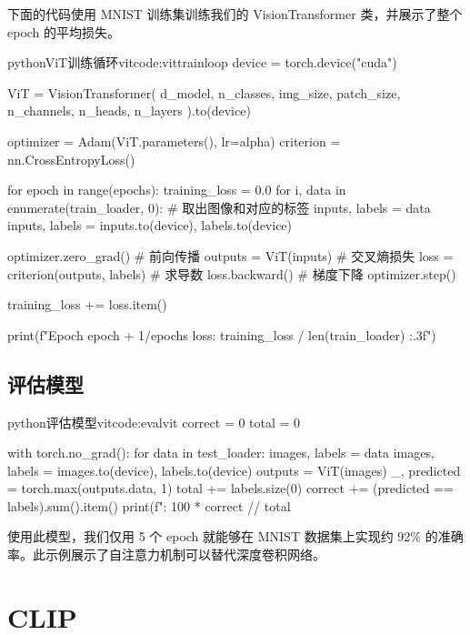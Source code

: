 \documentclass[lang=cn,newtx,10pt,scheme=chinese]{elegantbook}
\begin{document}
下面的代码使用 MNIST 训练集训练我们的 VisionTransformer 类，并展示了整个 epoch 的平均损失。

\begin{codebox}{python}{ViT训练循环}{vitcode:vittrainloop}
device = torch.device("cuda")

ViT = VisionTransformer(
    d_model,
    n_classes,
    img_size,
    patch_size,
    n_channels,
    n_heads,
    n_layers
).to(device)

optimizer = Adam(ViT.parameters(), lr=alpha)
criterion = nn.CrossEntropyLoss()

for epoch in range(epochs):
    training_loss = 0.0
    for i, data in enumerate(train_loader, 0):
        # 取出图像和对应的标签
        inputs, labels = data
        inputs, labels = inputs.to(device), labels.to(device)

        optimizer.zero_grad()
        # 前向传播
        outputs = ViT(inputs)
        # 交叉熵损失
        loss = criterion(outputs, labels)
        # 求导数
        loss.backward()
        # 梯度下降
        optimizer.step()

        training_loss += loss.item()

    print(f"Epoch {epoch + 1}/{epochs} loss: {training_loss  / len(train_loader) :.3f}")
\end{codebox}

\section{评估模型}

\begin{codebox}{python}{评估模型}{vitcode:evalvit}
correct = 0
total = 0

with torch.no_grad():
    for data in test_loader:
        images, labels = data
        images, labels = images.to(device), labels.to(device)
        outputs = ViT(images)
        _, predicted = torch.max(outputs.data, 1)
        total += labels.size(0)
        correct += (predicted == labels).sum().item()
    print(f": {100 * correct // total} %
\end{codebox}

使用此模型，我们仅用 5 个 epoch 就能够在 MNIST 数据集上实现约 92\% 的准确率。此示例展示了自注意力机制可以替代深度卷积网络。

\chapter{CLIP}
\end{document}

